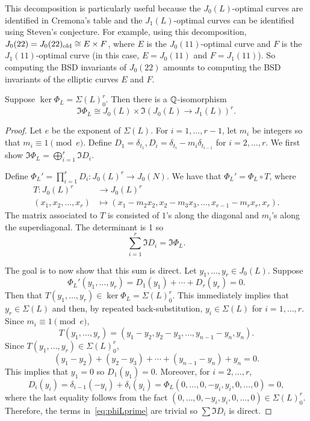\documentclass[11pt, proquest]{uwthesis}
\begin{document}
This decomposition is particularly useful because the $J_0(L)$-optimal curves
are identified in Cremona's table and the $J_1(L)$-optimal curves can be
identified using Steven's conjecture. For example, using this decomposition,
$J_0(22) = J_0(22)_{\mathrm{old}} \cong E\times F$, where $E$ is the $J_0(11)$-optimal
curve and $F$ is the $J_1(11)$-optimal curve (in this case, $E=J_0(11)$ and
$F=J_1(11)$). So computing the BSD invariants of $J_0(22)$ amounts to computing
the BSD invariants of the elliptic curves $E$ and $F$.

\begin{proposition}
    \label{prop:decomp}
    Suppose $\ker\Phi_L=\Sigma(L)_0 ^r$. Then there is a $\mathbb{Q}$-isomorphism
    \[
        \Im\Phi_L \cong J_0(L)\times \Im(J_0(L)\to J_1(L))^r.
    \]
\end{proposition}
\begin{proof}
    Let $e$ be the exponent of $\Sigma(L)$. For $i=1,\ldots,r-1$, let $m_i$ be
    integers so that $m_i \equiv 1 \pmod{e}$. Define $D_1 = \delta_{t_1},
    D_i = \delta_{t_i}-m_i\delta_{t_{i-1}}$
    for $i=2,\ldots,r$. We first show $\Im\Phi_L = \bigoplus_{i=1} ^r \Im D_i$.

    Define $\Phi_L '=\prod_{i=1} ^r D_i : J_0(L)^r \to J_0(N)$. We have that
    $\Phi_L' = \Phi_L \circ T$, where
    \begin{align*}
        T:J_0(L)^r & \to J_0(L)^r \\
        (x_1,x_2,\ldots,x_r)&\mapsto (x_1-m_2x_2,x_2-m_3 x_3,\ldots,x_{r-1}-m_r
        x_r, x_r).
    \end{align*}
    The matrix associated to $T$ is consisted of $1$'s along the diagonal and
    $m_i$'s along the superdiagonal. The determinant is 1 so
    \[
        \sum_{i=1} ^r \Im D_i = \Im \Phi_L.
    \]

    The goal is to now show that this sum is direct. Let $y_1,\ldots,y_r\in
    J_0(L)$. Suppose
    \begin{equation}
        \label{eq:phiLprime}
        \Phi_L ' (y_1,\ldots,y_r) =D_1(y_1)+ \cdots +D_r(y_r)=0.
    \end{equation}
    Then that $T(y_1,\ldots,y_r)\in \ker\Phi_L=\Sigma(L)_0 ^r$.  This
    immediately implies that $y_r\in \Sigma(L)$ and then, by repeated
    back-substitution, $y_i\in \Sigma(L)$ for $i=1,\ldots,r$. Since $m_i \equiv
    1 \pmod{e}$,
    \[
        T(y_1,\ldots,y_r)=(y_1-y_2,y_2-y_3,\ldots,y_{n-1}-y_n,y_n).
    \]
    Since $T(y_1,\ldots,y_r)\in \Sigma(L)_0 ^r$, 
    \[
        (y_1-y_2)+(y_2-y_3)+\cdots+(y_{n-1}-y_n)+y_n =0.
    \]
    This implies that $y_1=0$ so $D_1(y_1)=0$. Moreover, for $i=2,\ldots,r$,
    \begin{equation*}
        D_i(y_i) 
            = \delta_{i-1}(-y_i) + \delta_i (y_i) 
            = \Phi_L (0,\ldots,0,-y_i,y_i,0,\ldots,0) 
            = 0,
    \end{equation*}
    where the last equality follows from the fact
    $(0,\ldots,0,-y_i,y_i,0,\ldots,0)\in \Sigma(L)_0 ^r$. Therefore, the terms
    in~\eqref{eq:phiLprime} are trivial so $\sum \Im D_i$ is direct.


\end{proof}
\end{document}
